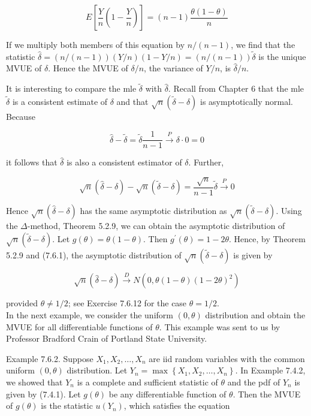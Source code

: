 $$
E\left[\frac{Y}{n}\left(1-\frac{Y}{n}\right)\right]=(n-1) \frac{\theta(1-\theta)}{n}
$$

If we multiply both members of this equation by $n /(n-1)$, we find that the statistic $\hat{\delta}=(n /(n-1))(Y / n)(1-Y / n)=(n /(n-1)) \tilde{\delta}$ is the unique MVUE of $\delta$. Hence the MVUE of $\delta / n$, the variance of $Y / n$, is $\hat{\delta} / n$.

It is interesting to compare the mle $\tilde{\delta}$ with $\hat{\delta}$. Recall from Chapter 6 that the mle $\tilde{\delta}$ is a consistent estimate of $\delta$ and that $\sqrt{n}(\tilde{\delta}-\delta)$ is asymptotically normal. Because

$$
\hat{\delta}-\tilde{\delta}=\tilde{\delta} \frac{1}{n-1} \xrightarrow{P} \delta \cdot 0=0
$$

it follows that $\hat{\delta}$ is also a consistent estimator of $\delta$. Further,


\begin{equation*}
\sqrt{n}(\hat{\delta}-\delta)-\sqrt{n}(\tilde{\delta}-\delta)=\frac{\sqrt{n}}{n-1} \tilde{\delta} \xrightarrow{P} 0 \tag{7.6.1}
\end{equation*}


Hence $\sqrt{n}(\hat{\delta}-\delta)$ has the same asymptotic distribution as $\sqrt{n}(\tilde{\delta}-\delta)$. Using the $\Delta$-method, Theorem 5.2.9, we can obtain the asymptotic distribution of $\sqrt{n}(\tilde{\delta}-\delta)$. Let $g(\theta)=\theta(1-\theta)$. Then $g^{\prime}(\theta)=1-2 \theta$. Hence, by Theorem 5.2.9 and (7.6.1), the asymptotic distribution of $\sqrt{n}(\tilde{\delta}-\delta)$ is given by

$$
\sqrt{n}(\hat{\delta}-\delta) \xrightarrow{D} N\left(0, \theta(1-\theta)(1-2 \theta)^{2}\right)
$$

provided $\theta \neq 1 / 2$; see Exercise 7.6.12 for the case $\theta=1 / 2$.\\
In the next example, we consider the uniform $(0, \theta)$ distribution and obtain the MVUE for all differentiable functions of $\theta$. This example was sent to us by Professor Bradford Crain of Portland State University.

Example 7.6.2. Suppose $X_{1}, X_{2}, \ldots, X_{n}$ are iid random variables with the common uniform $(0, \theta)$ distribution. Let $Y_{n}=\max \left\{X_{1}, X_{2}, \ldots, X_{n}\right\}$. In Example 7.4.2, we showed that $Y_{n}$ is a complete and sufficient statistic of $\theta$ and the pdf of $Y_{n}$ is given by (7.4.1). Let $g(\theta)$ be any differentiable function of $\theta$. Then the MVUE of $g(\theta)$ is the statistic $u\left(Y_{n}\right)$, which satisfies the equation

